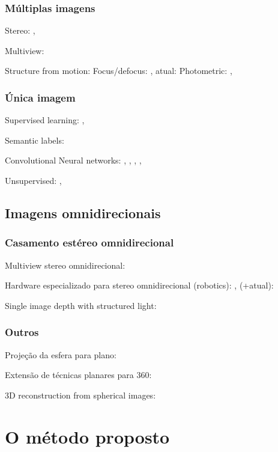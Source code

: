 \documentclass[cic,tc]{iiufrgs}
\begin{document}
\subsection{Múltiplas imagens}
Stereo: \citet{stereoSurvey2001},  \citet{stereoSurvey2016}

Multiview: \citet{multiViewStereo2015}

Structure from motion: \citet{structMotion2016}
Focus/defocus: \citet{defocus1987}, atual: \citet{defocus2015}
Photometric: \citet{photometricStereo1989}, \citet{photometricStereo2012}

\subsection{Única imagem}

Supervised learning: \citet{Saxena2005}, \citet{Saxena2008}

Semantic labels: \citet{Liu2010}

Convolutional Neural networks: 
\citet{Fayao2015}, \citet{Eigen2014}, \citet{Eigen2015}, \citet{Kuznietsov2017}, \citet{Li2017}

Unsupervised: \citet{Godard2016}, \citet{Zhou2017}


\section{Imagens omnidirecionais}

\subsection{Casamento estéreo omnidirecional}
Multiview stereo omnidirecional: \citet{Li2001}

Hardware especializado para stereo omnidirecional (robotics): \citet{gluckman1998}, \citet{Koyasu2001} (+atual): \citet{Lin2014}

Single image depth with structured light: \citet{Orghidan2005}

\subsection{Outros}
Projeção da esfera para plano: \citet{sun360}

Extensão de técnicas planares para 360: \citet{flat2sphere}

3D reconstruction from spherical images: \citet{panoContext}

\chapter{O método proposto}
\end{document}
